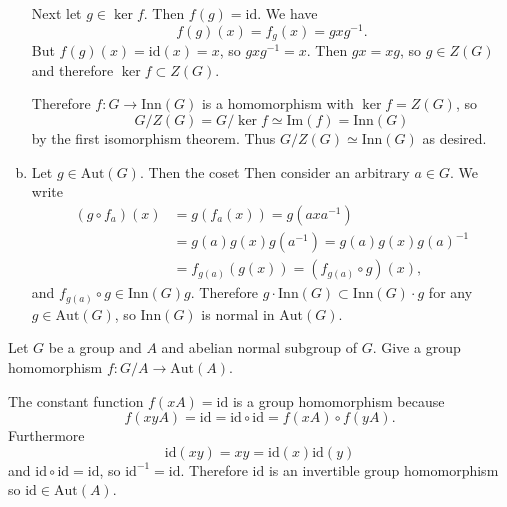 \documentclass{article}
\newcounter{Problem}
\newenvironment{Problem}{\begin{Exercise}[name={Problem},
                                          counter={Problem}]}
                        {\end{Exercise}}
\begin{document}
\begin{Answer}
\begin{enumerate}[(a)]
{            Next let $g \in \ker f$. Then $f(g) = \mathrm{id}$. We have
            $$
            f(g)(x) = f_g(x) = g x g^{-1}.
            $$
            But $f(g)(x) = \mathrm{id}(x) = x$, so $g x g^{-1} =
            x$. Then $g x = x g$, so $g \in Z(G)$
            and therefore $\ker f \subset Z(G)$.

            Therefore $f: G \to \mathrm{Inn}(G)$ is a homomorphism
            with $\ker f = Z(G)$, so
            $$
            G / Z(G) = G / \ker f \simeq \mathrm{Im}(f) = \mathrm{Inn}(G)
            $$
            by the first isomorphism theorem.
            Thus $G / Z(G) \simeq \mathrm{Inn}(G)$ as desired.
           }
      \item{
        Let $g \in \mathrm{Aut}(G)$. Then the coset
        Then consider an arbitrary $a \in G$. We write
        \begin{align*}
          (g \circ f_a)(x) 
            &= g(f_a(x)) = g(a x a^{-1}) \\
            &= g(a) g(x) g(a^{-1})
             = g(a) g(x) g(a)^{-1} \\
            &= f_{g(a)}(g(x))
             = (f_{g(a)} \circ g)(x),
        \end{align*}
        and $f_{g(a)} \circ g \in \mathrm{Inn}(G) g$. Therefore
        $g \cdot \mathrm{Inn}(G) \subset \mathrm{Inn}(G) \cdot g$ for any
        $g \in \mathrm{Aut}(G)$, so $\mathrm{Inn}(G)$ is normal
        in $\mathrm{Aut}(G)$.
      }
\end{enumerate}
\end{Answer}

\pagebreak

\begin{Problem}
Let $G$ be a group and $A$ and abelian normal subgroup of $G$. Give a
group homomorphism $f : G/A \to \mathrm{Aut}(A)$.
\end{Problem}

\begin{Answer}
The constant function $f(xA) = \mathrm{id}$ is a group homomorphism
because
$$
f(xyA) = \mathrm{id}
       = \mathrm{id} \circ \mathrm{id}
       = f(xA) \circ f(yA).
$$
Furthermore 
$$
\mathrm{id}(x y) = x y = \mathrm{id}(x) \mathrm{id}(y)
$$
and $\mathrm{id} \circ \mathrm{id} = \mathrm{id}$, so
$\mathrm{id}^{-1} = \mathrm{id}$. Therefore $\mathrm{id}$ is an
invertible group homomorphism so $\mathrm{id} \in \mathrm{Aut}(A)$.
\end{Answer}

\pagebreak
\end{document}
